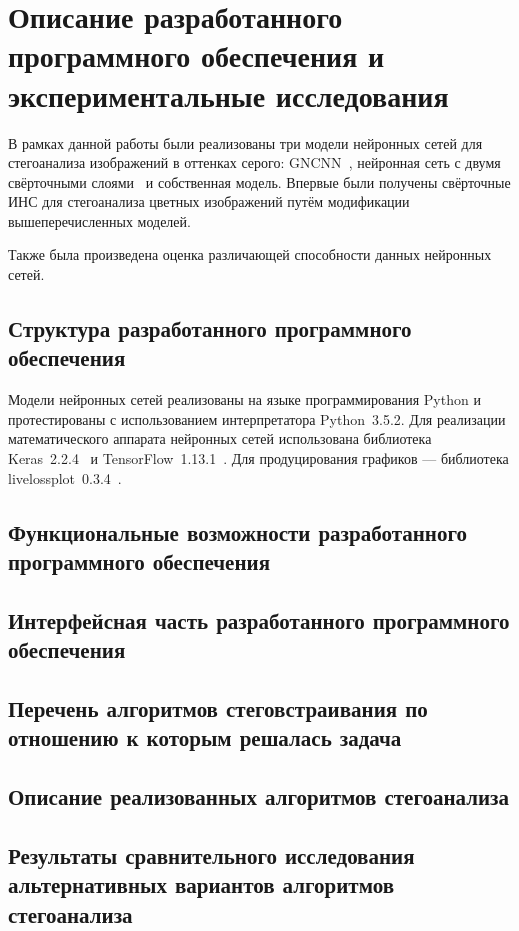 
\section{Описание разработанного программного обеспечения и экспериментальные исследования}

В рамках данной работы были реализованы три модели нейронных сетей для стегоанализа изображений в оттенках серого: GNCNN~\cite{GNCNN}, нейронная сеть с двумя свёрточными слоями~\cite{FrenchCNN} и собственная модель. Впервые были получены свёрточные ИНС для стегоанализа цветных изображений путём модификации вышеперечисленных моделей.

Также была произведена оценка различающей способности данных нейронных сетей.

\subsection{Структура разработанного программного обеспечения}

Модели нейронных сетей реализованы на языке программирования Python и протестированы с использованием интерпретатора Python~3.5.2. Для реализации математического аппарата нейронных сетей использована библиотека Keras~2.2.4~\cite{Keras} и TensorFlow~1.13.1~\cite{TensorFlow}. Для продуцирования графиков --- библиотека livelossplot~0.3.4~\cite{livelossplot}.

\subsection{Функциональные возможности разработанного программного обеспечения}
\subsection{Интерфейсная часть разработанного программного обеспечения}
\subsection{Перечень алгоритмов стеговстраивания по отношению к которым решалась задача}
\subsection{Описание реализованных алгоритмов стегоанализа}
\subsection{Результаты сравнительного исследования альтернативных вариантов алгоритмов стегоанализа}

